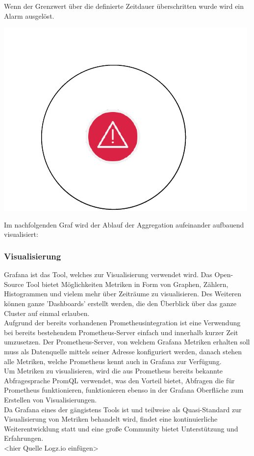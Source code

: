 \documentclass[a4paper,10pt]{scrartcl}
\begin{document}
Wenn der Grenzwert über die definierte Zeitdauer überschritten wurde wird ein Alarm ausgelöst.\\
\begin{minipage}{\linewidth}
  \includegraphics[scale=.3]{img/Datenaggregation/AlarmNew.png}  
\end{minipage} 


Im nachfolgenden Graf wird der Ablauf der Aggregation aufeinander aufbauend visualisiert:

\begin{minipage}{\linewidth}
  \centering
  \scalebox{.8}{}  
\end{minipage}

\subsubsection{Visualisierung}

Grafana ist das Tool, welches zur Visualisierung verwendet wird. Das Open-Source Tool bietet Möglichkeiten Metriken in Form von Graphen, Zählern, Histogrammen und vielem mehr über Zeiträume zu visualisieren. Des Weiteren können ganze 'Dashboards' erstellt werden, die den Überblick über das ganze Cluster auf einmal erlauben.\\
Aufgrund der bereits vorhandenen Prometheusintegration ist eine Verwendung bei bereits bestehendem Prometheus-Server einfach und innerhalb kurzer Zeit umzusetzen.
Der Prometheus-Server, von welchem Grafana Metriken erhalten soll muss als Datenquelle mittels seiner Adresse konfiguriert werden, danach stehen alle Metriken, welche Prometheus kennt auch in Grafana zur Verfügung.\\
Um Metriken zu visualisieren, wird die aus Prometheus bereits bekannte Abfragesprache PromQL verwendet, was den Vorteil bietet, Abfragen die für Prometheus funktionieren, funktionieren ebenso in der Grafana Oberfläche zum Erstellen von Visualisierungen.\\
Da Grafana eines der gängistens Tools ist und teilweise als Quasi-Standard zur Visualisierung von Metriken behandelt wird, findet eine kontinuierliche Weiterentwicklung statt und eine große Community bietet Unterstützung und Erfahrungen.\\<hier Quelle Logz.io einfügen>
\end{document}
